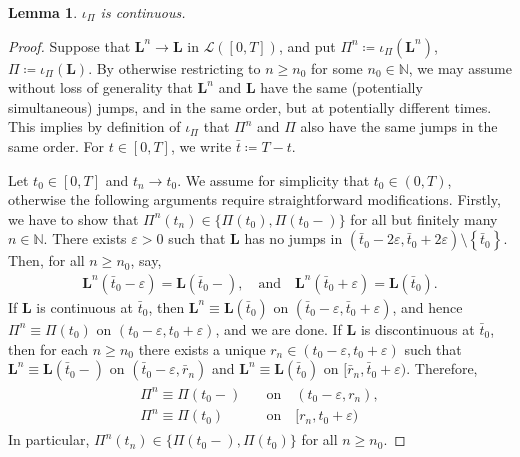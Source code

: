 \documentclass[reqno,draft]{amsart}
\numberwithin{equation}{section}
\theoremstyle{plain}
\newtheorem{lemma}[theorem]{Lemma}
\theoremstyle{remark}
\newcommand{\N}{\mathbb{N}} %
\newcommand{\fpart}{\Pi} %
\begin{document}
\begin{lemma}\label{lem:iotapi}
    $\iota_\fpart$ is continuous.
\end{lemma}
\begin{proof}
    Suppose that $\boldsymbol L^n \to \boldsymbol L$ in $\mathcal{L}([0,T])$, and put $\fpart^n \coloneqq \iota_\fpart(\boldsymbol L^n)$, $\fpart \coloneqq \iota_\fpart(\boldsymbol L)$. By otherwise restricting to $n\ge n_0$ for some $n_0\in \N$, we may assume without loss of generality that $\boldsymbol L^n$ and $\boldsymbol L$ have the same (potentially simultaneous) jumps, and in the same order, but at potentially different times. This implies by definition of $\iota_\fpart$ that $\fpart^n$ and $\fpart$ also have the same jumps in the same order. For $t\in [0,T]$, we write $\bar{t} \coloneqq T-t$.

    Let $t_0\in [0,T]$ and $t_n \to t_0$. We assume for simplicity that $t_0 \in (0,T)$, otherwise the following arguments require straightforward modifications. Firstly, we have to show that $\fpart^n(t_n) \in \{\fpart(t_0), \fpart(t_0-)\}$ for all but finitely many $n\in \N$.
    There exists $\varepsilon > 0$ such that $\boldsymbol L$ has no jumps in $(\bar{t}_0-2\varepsilon,\bar{t}_0+2\varepsilon) \setminus\left\{ \bar{t}_0 \right\} $. Then, for all $n\ge n_0$, say,
    \begin{align*}
        \boldsymbol L^n(\bar{t}_0 - \varepsilon) =
        \boldsymbol L(\bar{t}_0-),\quad \text{and} \quad
        \boldsymbol L^n(\bar{t}_0 + \varepsilon) =
        \boldsymbol L(\bar{t}_0).
    \end{align*}
    If $\boldsymbol L$ is continuous at $\bar{t}_0$, then $\boldsymbol L^n \equiv \boldsymbol L(\bar{t}_0)$ on $(\bar{t}_0-\varepsilon,\bar{t}_0+\varepsilon)$, and hence $\fpart^n \equiv \fpart(t_0)$ on $(t_0-\varepsilon,t_0+\varepsilon)$, and we are done.
    If $\boldsymbol L$ is discontinuous at $\bar{t}_0$, then for each $n\ge n_0$ there exists a unique $r_n \in (t_0-\varepsilon,t_0+\varepsilon)$ such that $\boldsymbol L^n \equiv \boldsymbol L(\bar{t}_0-)$ on $(\bar{t}_0-\varepsilon, \bar{r}_n)$ and $\boldsymbol L^n \equiv \boldsymbol L(\bar{t}_0)$ on $[\bar{r}_n,\bar{t}_0+\varepsilon)$. Therefore,
    \begin{align}\begin{split}\label{eq:prf:pi map continuous:1}
        \fpart^n \equiv \fpart(t_0-)\quad &\text{on}\quad (t_0-\varepsilon,r_n),\\
        \fpart^n \equiv \fpart(t_0)\phantom{-}\quad &\text{on}\quad [r_n,t_0+\varepsilon)
    \end{split}\end{align}
    In particular, $\fpart^n(t_n) \in \{\fpart(t_0-),\fpart(t_0)\}$ for all $n\ge n_0$.


\end{proof}
\end{document}
